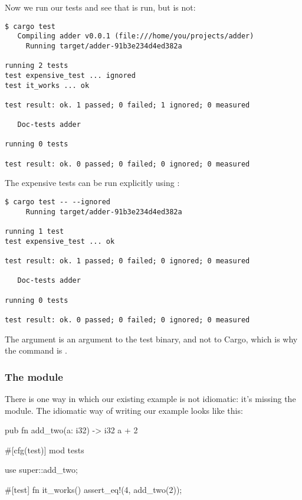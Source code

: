 Now we run our tests and see that  is run, but  is not:

\begin{verbatim}
$ cargo test
   Compiling adder v0.0.1 (file:///home/you/projects/adder)
     Running target/adder-91b3e234d4ed382a

running 2 tests
test expensive_test ... ignored
test it_works ... ok

test result: ok. 1 passed; 0 failed; 1 ignored; 0 measured

   Doc-tests adder

running 0 tests

test result: ok. 0 passed; 0 failed; 0 ignored; 0 measured
\end{verbatim}

The expensive tests can be run explicitly using :

\begin{verbatim}
$ cargo test -- --ignored
     Running target/adder-91b3e234d4ed382a

running 1 test
test expensive_test ... ok

test result: ok. 1 passed; 0 failed; 0 ignored; 0 measured

   Doc-tests adder

running 0 tests

test result: ok. 0 passed; 0 failed; 0 ignored; 0 measured
\end{verbatim}

The  argument is an argument to the test binary, and not to Cargo, which is why the command is 
.

\subsubsection*{The  module}

There is one way in which our existing example is not idiomatic: it's missing the  module. The idiomatic way of 
writing our example looks like this:

\begin{rustc}
pub fn add_two(a: i32) -> i32 {
    a + 2
}

#[cfg(test)]
mod tests {
    use super::add_two;

    #[test]
    fn it_works() {
        assert_eq!(4, add_two(2));
    }
}
\end{rustc}

